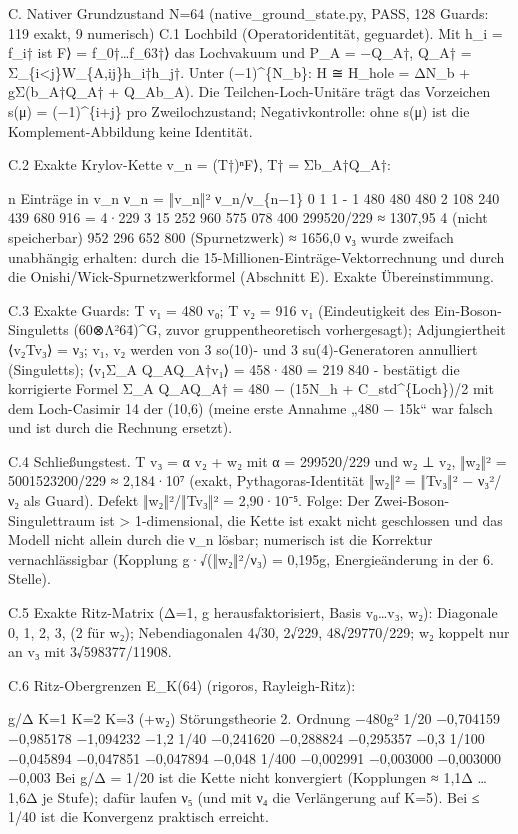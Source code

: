 C. Nativer Grundzustand N=64 (native\_ground\_state.py, PASS, 128
Guards: 119 exakt, 9 numerisch) C.1 Lochbild (Operatoridentität,
geguardet). Mit h\_i = f\_i† ist \textbar F⟩ =
f\_0†\ldots f\_63†⟩ das Lochvakuum und P\_A = −Q\_A†, Q\_A† =
Σ\_\{i\textless j\}W\_\{A,ij\}h\_i†h\_j†. Unter (−1)\^{}\{N\_b\}: H ≅
H\_hole = ΔN\_b + gΣ(b\_A†Q\_A† + Q\_Ab\_A). Die Teilchen-Loch-Unitäre
trägt das Vorzeichen s(μ) = (−1)\^{}\{i+j\} pro Zweilochzustand;
Negativkontrolle: ohne s(μ) ist die Komplement-Abbildung keine
Identität.

C.2 Exakte Krylov-Kette v\_n = (T†)ⁿ\textbar F⟩, T† = Σb\_A†Q\_A†:

n Einträge in v\_n ν\_n = ‖v\_n‖² ν\_n/ν\_\{n−1\} 0 1 1 - 1 480 480 480
2 108 240 439 680 916 = 4·229 3 15 252 960 575 078 400 299520/229 ≈
1307,95 4 (nicht speicherbar) 952 296 652 800 (Spurnetzwerk) ≈ 1656,0 ν₃
wurde zweifach unabhängig erhalten: durch die
15-Millionen-Einträge-Vektorrechnung und durch die
Onishi/Wick-Spurnetzwerkformel (Abschnitt E). Exakte Übereinstimmung.

C.3 Exakte Guards: T v₁ = 480 v₀; T v₂ = 916 v₁ (Eindeutigkeit des
Ein-Boson-Singuletts (60⊗Λ²64̄)\^{}G, zuvor gruppentheoretisch
vorhergesagt); Adjungiertheit ⟨v₂\textbar Tv₃⟩ = ν₃; v₁, v₂ werden von 3
so(10)- und 3 su(4)-Generatoren annulliert (Singuletts);
⟨v₁\textbar Σ\_A Q\_AQ\_A†\textbar v₁⟩ = 458·480 = 219 840 - bestätigt
die korrigierte Formel Σ\_A Q\_AQ\_A† = 480 − (15N\_h +
C\_std\^{}\{Loch\})/2 mit dem Loch-Casimir 14 der (10,6) (meine erste
Annahme „480 − 15k`` war falsch und ist durch die Rechnung ersetzt).

C.4 Schließungstest. T v₃ = α v₂ + w₂ mit α = 299520/229 und w₂ ⊥ v₂,
‖w₂‖² = 5001523200/229 ≈ 2,184·10⁷ (exakt, Pythagoras-Identität ‖w₂‖² =
‖Tv₃‖² − ν₃²/ν₂ als Guard). Defekt ‖w₂‖²/‖Tv₃‖² = 2,90·10⁻⁵. Folge: Der
Zwei-Boson-Singulettraum ist \textgreater{} 1-dimensional, die Kette ist
exakt nicht geschlossen und das Modell nicht allein durch die ν\_n
lösbar; numerisch ist die Korrektur vernachlässigbar (Kopplung
g·√(‖w₂‖²/ν₃) = 0,195g, Energieänderung in der 6. Stelle).

C.5 Exakte Ritz-Matrix (Δ=1, g herausfaktorisiert, Basis v₀\ldots v₃,
w₂): Diagonale 0, 1, 2, 3, (2 für w₂); Nebendiagonalen 4√30, 2√229,
48√29770/229; w₂ koppelt nur an v₃ mit 3√598377/11908.

C.6 Ritz-Obergrenzen E\_K(64) (rigoros, Rayleigh-Ritz):

g/Δ K=1 K=2 K=3 (+w₂) Störungstheorie 2. Ordnung −480g² 1/20 −0,704159
−0,985178 −1,094232 −1,2 1/40 −0,241620 −0,288824 −0,295357 −0,3 1/100
−0,045894 −0,047851 −0,047894 −0,048 1/400 −0,002991 −0,003000 −0,003000
−0,003 Bei g/Δ = 1/20 ist die Kette nicht konvergiert (Kopplungen ≈ 1,1Δ
\ldots{} 1,6Δ je Stufe); dafür laufen ν₅ (und mit ν₄ die Verlängerung
auf K=5). Bei ≤ 1/40 ist die Konvergenz praktisch erreicht.

